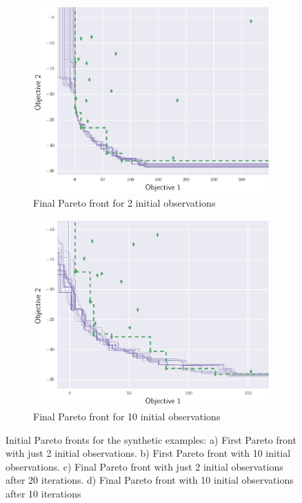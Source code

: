 \documentclass{article}
\begin{document}
\begin{figure}[!t]
    \begin{subfigure}{0.45\textwidth}
        \includegraphics[width=\textwidth]{li_ex1_19}
        \caption{Final Pareto front for 2 initial observations}
        \label{li_final}
    \end{subfigure}
    \hfill
    \begin{subfigure}{0.45\textwidth}
        \includegraphics[width=\textwidth]{hi_ex1_09}
        \caption{Final Pareto front for 10 initial observations}
        \label{hi_final}
    \end{subfigure}
\caption{Initial Pareto fronts for the synthetic examples: a) First Pareto front with just 2 initial observations. b) First Pareto front with 10 initial observations. c) Final Pareto front with just 2 initial observations after 20 iterations. d) Final Pareto front with 10 initial observations after 10 iterations}
\label{fronts}
\end{figure}
\end{document}
